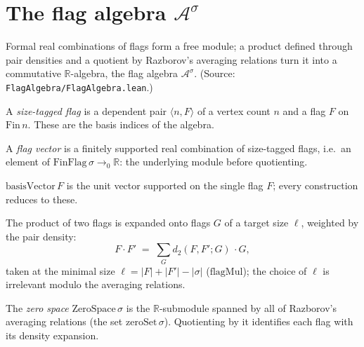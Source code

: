 
\chapter{The flag algebra $\mathcal{A}^\sigma$}
\label{chap:algebra}

Formal real combinations of flags form a free module; a product defined through
pair densities and a quotient by Razborov's averaging relations turn it into a
commutative $\mathbb{R}$-algebra, the flag algebra $\mathcal{A}^\sigma$.
(Source: \texttt{FlagAlgebra/FlagAlgebra.lean}.)

\begin{definition}
  \label{def:fin-flag}
  \leanok
  A \emph{size-tagged flag} is a dependent pair $\langle n, F\rangle$ of a vertex
  count $n$ and a flag $F$ on $\mathrm{Fin}\,n$. These are the basis indices of
  the algebra.
\end{definition}

\begin{definition}
  \label{def:flag-vector}
  \leanok
  A \emph{flag vector} is a finitely supported real combination of size-tagged
  flags, i.e.\ an element of $\mathrm{FinFlag}\,\sigma \to_{0} \mathbb{R}$: the
  underlying module before quotienting.
\end{definition}

\begin{definition}
  \label{def:basis-vector}
  \leanok
  $\mathrm{basisVector}\,F$ is the unit vector supported on the single flag $F$;
  every construction reduces to these.
\end{definition}

\begin{definition}
  \label{def:flag-mul}
  \leanok
  The product of two flags is expanded onto flags $G$ of a target size $\ell$,
  weighted by the pair density:
  \[ F \cdot F' \;=\; \sum_{G} d_2(F,F';G)\,\cdot G, \]
  taken at the minimal size $\ell = |F| + |F'| - |\sigma|$
  ($\mathrm{flagMul}$); the choice of $\ell$ is irrelevant modulo the averaging
  relations.
\end{definition}

\begin{definition}
  \label{def:zero-space}
  \leanok
  The \emph{zero space} $\mathrm{ZeroSpace}\,\sigma$ is the $\mathbb{R}$-submodule
  spanned by all of Razborov's averaging relations (the set
  $\mathrm{zeroSet}\,\sigma$). Quotienting by it identifies each flag with its
  density expansion.
\end{definition}

